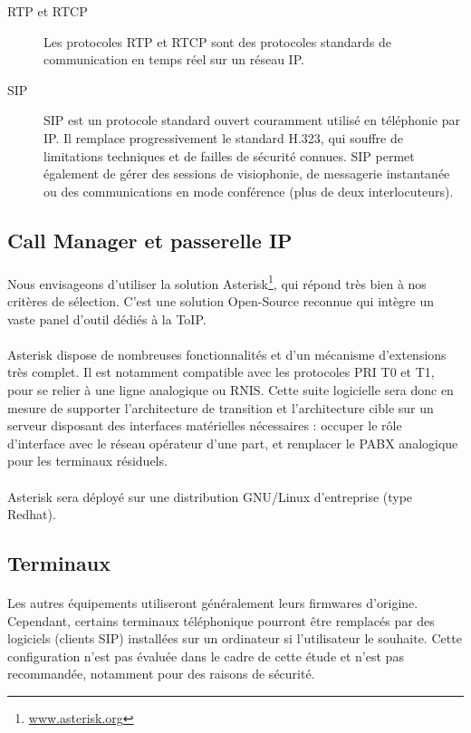 \begin{description}
	\item[RTP et RTCP] Les protocoles \ac{RTP} et \ac{RTCP} sont des protocoles
	standards de communication en temps réel sur un réseau IP.
	\item[SIP] \ac{SIP} est un protocole standard ouvert couramment utilisé en
	téléphonie par IP. Il remplace progressivement le standard H.323, qui souffre
	de limitations techniques et de failles de sécurité connues. SIP permet
	également de gérer des sessions de visiophonie, de messagerie instantanée ou
	des communications en mode conférence (plus de deux interlocuteurs).
\end{description}

\subsection{Call Manager et passerelle IP}

\paragraph{} Nous envisageons d'utiliser la solution
Asterisk\footnote{\url{www.asterisk.org}}, qui répond très bien à nos critères
de sélection. C'est une solution Open-Source reconnue qui intègre un vaste panel
d'outil dédiés à la ToIP.

\paragraph{} Asterisk dispose de nombreuses fonctionnalités et d'un mécanisme
d'extensions très complet. Il est notamment compatible avec les protocoles
\ac{PRI} T0 et T1, pour se relier à une ligne analogique ou \ac{RNIS}. Cette
suite logicielle sera donc en mesure de supporter l'architecture de transition
et l'architecture cible sur un serveur disposant des interfaces matérielles
nécessaires : occuper le rôle d'interface avec le réseau opérateur d'une part,
et remplacer le PABX analogique pour les terminaux résiduels.

\paragraph{} Asterisk sera déployé sur une distribution GNU/Linux d'entreprise
(type Redhat).

\subsection{Terminaux}

\paragraph{} Les autres équipements utiliseront généralement leurs firmwares
d'origine. Cependant, certains terminaux téléphonique pourront être remplacés
par des logiciels (clients SIP) installées sur un ordinateur si l'utilisateur le
souhaite. Cette configuration n'est pas évaluée dans le cadre de cette étude et
n'est pas recommandée, notamment pour des raisons de sécurité.
